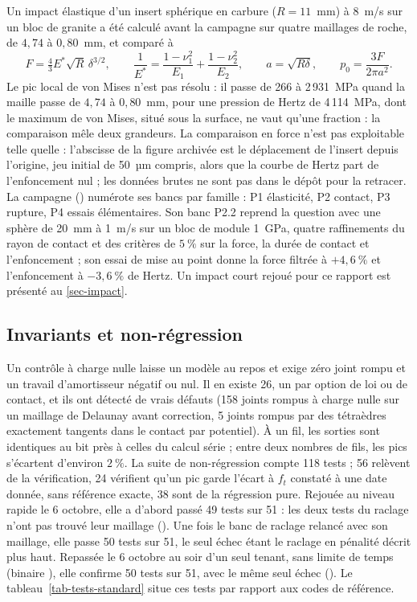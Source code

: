 Un impact élastique d'un insert sphérique en carbure ($R = 11$~mm) à 8~m/s sur un bloc de granite a été calculé avant la campagne sur quatre maillages de roche, de $4{,}74$ à $0{,}80$~mm, et comparé à
\begin{equation}
F = \tfrac43 E^*\sqrt R\,\delta^{3/2}, \qquad \frac{1}{E^*} = \frac{1-\nu_1^2}{E_1} + \frac{1-\nu_2^2}{E_2}, \qquad a = \sqrt{R\delta}, \qquad p_0 = \frac{3F}{2\pi a^2} .
\end{equation}
Le pic local de von Mises n'est pas résolu : il passe de 266 à 2\,931~MPa quand la maille passe de $4{,}74$ à $0{,}80$~mm, pour une pression de Hertz de 4\,114~MPa, dont le maximum de von Mises, situé sous la surface, ne vaut qu'une fraction : la comparaison mêle deux grandeurs. La comparaison en force n'est pas exploitable telle quelle : l'abscisse de la figure archivée est le déplacement de l'insert depuis l'origine, jeu initial de 50~µm compris, alors que la courbe de Hertz part de l'enfoncement nul ; les données brutes ne sont pas dans le dépôt pour la retracer. La campagne () numérote ses bancs par famille : P1 élasticité, P2 contact, P3 rupture, P4 essais élémentaires. Son banc P2.2 reprend la question avec une sphère de 20~mm à 1~m/s sur un bloc de module 1~GPa, quatre raffinements du rayon de contact et des critères de $5~\%$ sur la force, la durée de contact et l'enfoncement ; son essai de mise au point donne la force filtrée à $+4{,}6~\%$ et l'enfoncement à $-3{,}6~\%$ de Hertz. Un impact court rejoué pour ce rapport est présenté au \cref{sec-impact}.

\subsection{Invariants et non-régression}

Un contrôle à charge nulle laisse un modèle au repos et exige zéro joint rompu et un travail d'amortisseur négatif ou nul. Il en existe 26, un par option de loi ou de contact, et ils ont détecté de vrais défauts (158 joints rompus à charge nulle sur un maillage de Delaunay avant correction, 5 joints rompus par des tétraèdres exactement tangents dans le contact par potentiel). À un fil, les sorties sont identiques au bit près à celles du calcul série ; entre deux nombres de fils, les pics s'écartent d'environ $2~\%$. La suite de non-régression compte 118 tests ; 56 relèvent de la vérification, 24 vérifient qu'un pic garde l'écart à $f_t$ constaté à une date donnée, sans référence exacte, 38 sont de la régression pure. Rejouée au niveau rapide le 6 octobre, elle a d'abord passé 49 tests sur 51 : les deux tests du raclage n'ont pas trouvé leur maillage (). Une fois le banc de raclage relancé avec son maillage, elle passe 50 tests sur 51, le seul échec étant le raclage en pénalité décrit plus haut. Repassée le 6 octobre au soir d'un seul tenant, sans limite de temps (binaire ), elle confirme 50 tests sur 51, avec le même seul échec (). Le tableau~\ref{tab-tests-standard} situe ces tests par rapport aux codes de référence.

